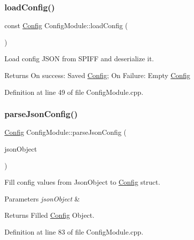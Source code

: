 \subsubsection{\texorpdfstring{loadConfig()}{loadConfig()}}
{\footnotesize\ttfamily const \mbox{\hyperlink{struct_config}{Config}} Config\+Module\+::load\+Config (\begin{DoxyParamCaption}{ }\end{DoxyParamCaption})}



Load config J\+S\+ON from S\+P\+I\+FF and deserialize it. 

\begin{DoxyReturn}{Returns}
On success\+: Saved \mbox{\hyperlink{struct_config}{Config}}; On Failure\+: Empty \mbox{\hyperlink{struct_config}{Config}} 
\end{DoxyReturn}


Definition at line 49 of file Config\+Module.\+cpp.

\mbox{\label{class_config_module_a937d05a9dd8761526d35b648d5823030}} 
\subsubsection{\texorpdfstring{parseJsonConfig()}{parseJsonConfig()}}
{\footnotesize\ttfamily \mbox{\hyperlink{struct_config}{Config}} Config\+Module\+::parse\+Json\+Config (\begin{DoxyParamCaption}\item[{const Json\+Object \&}]{json\+Object }\end{DoxyParamCaption})\hspace{0.3cm}{\ttfamily [private]}}



Fill config values from Json\+Object to \mbox{\hyperlink{struct_config}{Config}} struct. 


\begin{DoxyParams}{Parameters}
{\em json\+Object} & \\
\hline
\end{DoxyParams}
\begin{DoxyReturn}{Returns}
Filled \mbox{\hyperlink{struct_config}{Config}} Object. 
\end{DoxyReturn}


Definition at line 83 of file Config\+Module.\+cpp.


